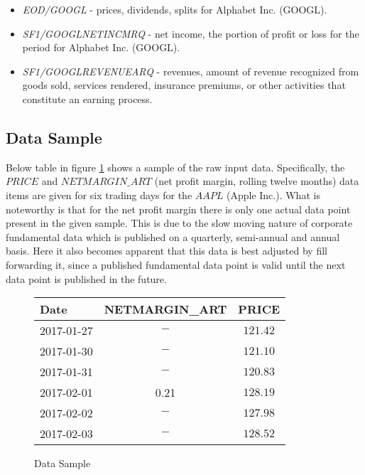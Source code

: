 \documentclass[dvips,12pt]{article}
\begin{document}
\begin{itemize}
	\item \emph{EOD/GOOGL} - prices, dividends, splits for Alphabet Inc. (GOOGL).
	\item \emph{SF1/GOOGL\textunderscore NETINC\textunderscore MRQ} - net income, the portion of profit or loss for the period for Alphabet Inc. (GOOGL).
	\item \emph{SF1/GOOGL\textunderscore REVENUE\textunderscore ARQ} -  revenues, amount of revenue recognized from goods sold, services rendered, insurance premiums, or other activities that constitute an earning process.
\end{itemize}

\subsection*{Data Sample}
Below table in figure \ref{fig:sample} shows a sample of the raw input data. Specifically, the $PRICE$ and $NETMARGIN\_ART$ (net profit margin, rolling twelve months) data items are given for six trading days for the $AAPL$ (Apple Inc.). What is noteworthy is that for the net profit margin there is only one actual data point present in the given sample. This is due to the slow moving nature of corporate fundamental data which is published on a quarterly, semi-annual and annual basis. Here it also becomes apparent that this data is best adjusted by fill forwarding it, since a published fundamental data point is valid until the next data point is published in the future.
	
\begin{center}
	\begin{figure}
		\begin{tabular}{lcc}
			Date              						& NETMARGIN\_ART & PRICE \\
			\hline
			2017-01-27 		& $-$ 		& $121.42$ \\
			2017-01-30		& $-$ 		& $121.10$ \\
			2017-01-31     & $-$ 	& $120.83$ \\
			2017-02-01     	& 0.21 			& $128.19$ \\
			2017-02-02    	& $-$ 		& $127.98$\\
			2017-02-03     	& $-$ 				& $128.52$  \\	
		\end{tabular}
		\caption{Data Sample}
	  	\label{fig:sample}	
	\end{figure}
\end{center}
\end{document}
